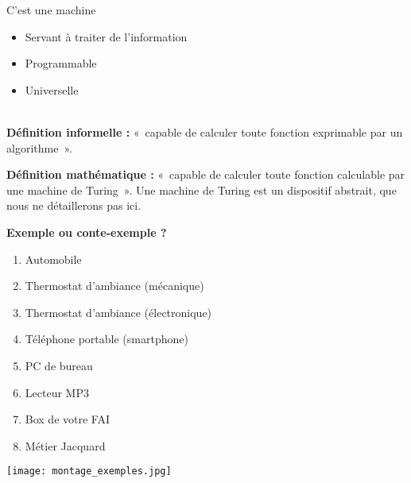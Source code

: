 \begin{defi}
C'est une machine
\begin{itemize}
\item Servant à traiter de l'information
\item Programmable
\item Universelle
\end{itemize}
\end{defi}

\begin{defi}[Universelle] ~\\
\textbf{Définition informelle :} «~capable de calculer toute fonction exprimable par un
algorithme~».

\noindent \textbf{Définition mathématique :} «~capable de calculer toute fonction calculable par
  une machine de Turing~». Une machine de Turing est un dispositif abstrait, que nous ne détaillerons pas ici. 
\end{defi}

\begin{exemple}
\textbf{Exemple ou conte-exemple ?}

\begin{minipage}{0.4\textwidth}
\begin{enumerate}
\item Automobile
\item Thermostat d'ambiance (mécanique)
\item Thermostat d'ambiance (électronique)
\item Téléphone portable (smartphone)
\item PC de bureau
\item Lecteur MP3
\item Box de votre FAI
\item Métier Jacquard
\end{enumerate}

\end{minipage}
\begin{minipage}{0.5\textwidth}
\begin{center}
\texttt{[image: montage\_exemples.jpg]}
\end{center}
\end{minipage}
\end{exemple}







